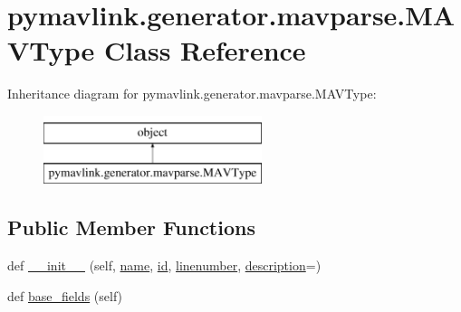 \hypertarget{classpymavlink_1_1generator_1_1mavparse_1_1MAVType}{}\section{pymavlink.\+generator.\+mavparse.\+M\+A\+V\+Type Class Reference}
\label{classpymavlink_1_1generator_1_1mavparse_1_1MAVType}
Inheritance diagram for pymavlink.\+generator.\+mavparse.\+M\+A\+V\+Type\+:\begin{figure}[H]
\begin{center}
\leavevmode
\includegraphics[height=2.000000cm]{classpymavlink_1_1generator_1_1mavparse_1_1MAVType}
\end{center}
\end{figure}
\subsection*{Public Member Functions}
\begin{DoxyCompactItemize}
\item 
def \mbox{\hyperlink{classpymavlink_1_1generator_1_1mavparse_1_1MAVType_a2b349bf03d33eb679e249919fb04daef}{\+\_\+\+\_\+init\+\_\+\+\_\+}} (self, \mbox{\hyperlink{classpymavlink_1_1generator_1_1mavparse_1_1MAVType_a823ea7c0a71ae5120a694964e2f6148f}{name}}, \mbox{\hyperlink{classpymavlink_1_1generator_1_1mavparse_1_1MAVType_a80483a5197aff1cf439f9830b3e87e95}{id}}, \mbox{\hyperlink{classpymavlink_1_1generator_1_1mavparse_1_1MAVType_aeb0811086c27087eaf1566f7f71b6d3a}{linenumber}}, \mbox{\hyperlink{classpymavlink_1_1generator_1_1mavparse_1_1MAVType_a17b35e45a6c81c122cd9b2bad5d9d915}{description}}=\textquotesingle{}\textquotesingle{})
\item 
def \mbox{\hyperlink{classpymavlink_1_1generator_1_1mavparse_1_1MAVType_ac07035e475c25d71205939bc52bafcdc}{base\+\_\+fields}} (self)
\end{DoxyCompactItemize}
